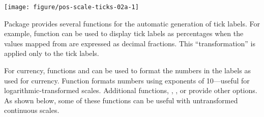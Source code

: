 \documentclass[krantz2]{krantz}\usepackage{knitr}
\begin{document}
\begin{knitrout}\footnotesize
{}\color{fgcolor}\begin{kframe}
\begin{alltt}
 \hlopt{+} 
\end{alltt}
\end{kframe}

{\centering \texttt{[image: figure/pos-scale-ticks-02a-1]} 

}


\end{knitrout}

Package  provides several functions for the automatic generation of tick labels. For example, function  can be used to display tick labels as percentages when the values mapped from  are expressed as decimal fractions. This ``transformation'' is applied only to the tick labels.

\begin{knitrout}\footnotesize
{}\color{fgcolor}\begin{kframe}
\begin{alltt}
 \hlkwb{<-}
  \hlstd{(}   \hlstd{=} \hlstd{(}    \hlopt{/}  \hlopt{+}
  \hlstd{()} \hlopt{+}
  \hlstd{(} 
\end{alltt}
\end{kframe}
\end{knitrout}

\sloppy
For currency, functions  and  can be used to format the numbers in the labels as used for currency. Function  formats numbers using exponents of 10---useful for logarithmic-transformed scales. Additional functions, , , or  provide other options. As shown below, some of these functions can be useful with untransformed continuous scales. 
\begin{knitrout}\footnotesize
{}\color{fgcolor}\begin{kframe}
\begin{alltt}
 \hlkwb{<-}
  \hlstd{(}   \hlstd{=} \hlstd{(}    \hlopt{*} \hlstd{))} \hlopt{+}
  \hlstd{()} \hlopt{+}
  \hlstd{(} \hlstd{=} \hlstd{,}
                      \hlstd{=} \hlstd{(} \hlstd{=} \hlstd{(}\hlstd{)))}
\end{alltt}
\end{kframe}
\end{knitrout}
\end{document}
